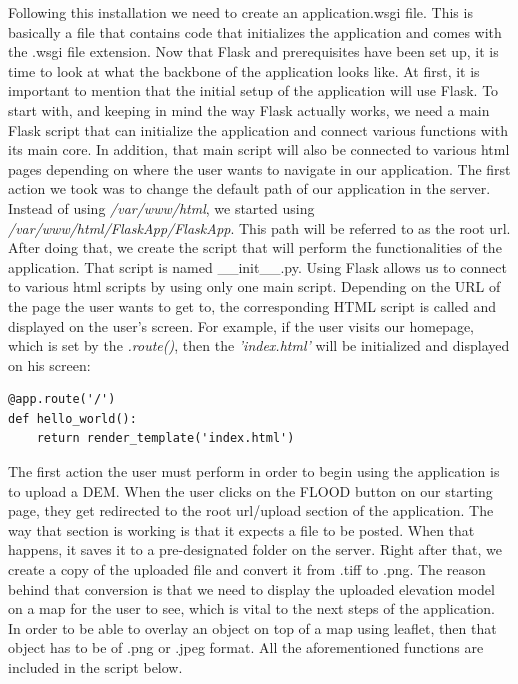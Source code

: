 Following this installation we need to create an application.wsgi file. This is basically a file that contains code that initializes the application and comes with the .wsgi file extension. 
Now that Flask and prerequisites have been set up, it is time to look at what the backbone of the application looks like. At first, it is important to mention that the initial setup of the application will use Flask. To start with, and keeping in mind the way Flask actually works, we need a main Flask script that can initialize the application and connect various functions with its main core. In addition, that main script will also be connected to various html pages depending on where the user wants to navigate in our application.
The first action we took was to change the default path of our application in the server. Instead of using \textit{/var/www/html}, we started using \textit{/var/www/html/FlaskApp/FlaskApp}. This path will be referred to as the root url. After doing that, we create the script that will perform the functionalities of the application. That script is named \_\_init\_\_.py. Using Flask allows us to connect to various html scripts by using  only one main script. Depending on the URL of the page the user wants to get to, the corresponding HTML script is called and displayed on the user's screen. For example, if the user visits our homepage, which is set by the \textit{\@app.route()}, then the \textit{'index.html'} will be initialized and displayed on his screen:\\

\begin{lstlisting}
@app.route('/')
def hello_world():
	return render_template('index.html')
\end{lstlisting}

The first action the user must perform in order to begin using the application is to upload a DEM. When the user clicks on the FLOOD button on our starting page, they get redirected to the root url/upload  section of the application. The way that section is working is that it expects a file to be posted. When that happens, it saves it to a pre-designated folder on the server. Right after that, we create a copy of the uploaded file and convert it from .tiff to .png. The reason behind that conversion is that we need to display the uploaded elevation model on a map for the user to see, which is vital to the next steps of the application. In order to be able to overlay an object on top of a map using leaflet, then that object has to be of .png or .jpeg format. All the aforementioned functions are included in the script below.\\

